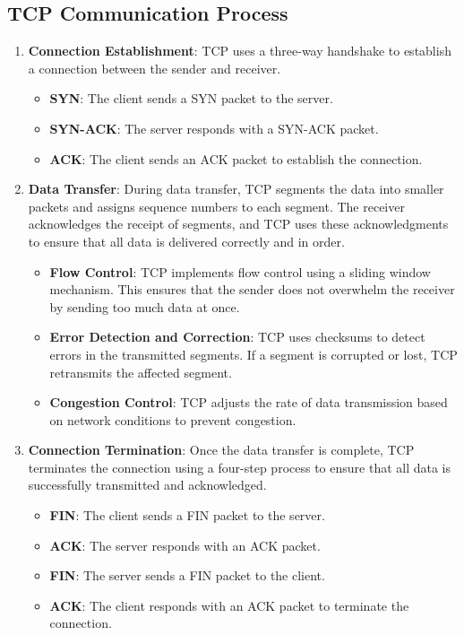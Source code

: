 \subsection{TCP Communication Process}
\begin{enumerate}
    \item \textbf{Connection Establishment}: TCP uses a three-way handshake to establish a connection between the sender and receiver.
    \begin{itemize}
        \item \textbf{SYN}: The client sends a SYN packet to the server.
        \item \textbf{SYN-ACK}: The server responds with a SYN-ACK packet.
        \item \textbf{ACK}: The client sends an ACK packet to establish the connection.
    \end{itemize}
    \item \textbf{Data Transfer}: During data transfer, TCP segments the data into smaller packets and assigns sequence numbers to each segment. The receiver acknowledges the receipt of segments, and TCP uses these acknowledgments to ensure that all data is delivered correctly and in order.
    \begin{itemize}
        \item \textbf{Flow Control}: TCP implements flow control using a sliding window mechanism. This ensures that the sender does not overwhelm the receiver by sending too much data at once.
        \item \textbf{Error Detection and Correction}: TCP uses checksums to detect errors in the transmitted segments. If a segment is corrupted or lost, TCP retransmits the affected segment.
        \item \textbf{Congestion Control}: TCP adjusts the rate of data transmission based on network conditions to prevent congestion.
    \end{itemize}
    \item \textbf{Connection Termination}: Once the data transfer is complete, TCP terminates the connection using a four-step process to ensure that all data is successfully transmitted and acknowledged.
    \begin{itemize}
        \item \textbf{FIN}: The client sends a FIN packet to the server.
        \item \textbf{ACK}: The server responds with an ACK packet.
        \item \textbf{FIN}: The server sends a FIN packet to the client.
        \item \textbf{ACK}: The client responds with an ACK packet to terminate the connection.
    \end{itemize}
\end{enumerate}

